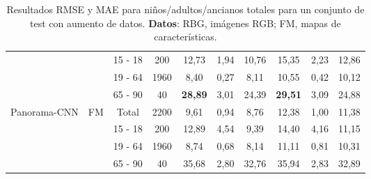 \begin{table}[ht]
{\begin{tabular}{|l|c|c|c|c|c|c|c|c|c|}
 &  & 15 - 18 & 200 & 12,73 & 1,94 & 10,76 & 15,35 & 2,23 & 12,86 \\
 &  & 19 - 64 & 1960 & 8,40 & 0,27 & 8,11 & 10,55 & 0,42 & 10,12 \\
 &  & 65 - 90 & 40 & \textbf{28,89} & 3,01 & 24,39 & \textbf{29,51} & 3,09 & 24,88 \\ 
\hline
\multirow{4}{*}{Panorama-CNN} & \multirow{4}{*}{FM} & Total & 2200 & 9,61 & 0,94 & 8,76 & 12,38 & 1,00 & 11,38 \\
 &  & 15 - 18 & 200 & 12,89 & 4,54 & 9,39 & 14,40 & 4,16 & 11,15 \\
 &  & 19 - 64 & 1960 & 8,74 & 0,68 & 8,14 & 11,11 & 0,81 & 10,31 \\
 &  & 65 - 90 & 40 & 35,68 & 2,80 & 32,76 & 35,94 & 2,83 & 32,89 \\
\hline
\end{tabular}
}
\caption[Resultados RMSE y MAE para niños/adultos/ancianos totales para un conjunto de test con aumento de datos.]{Resultados RMSE y MAE para niños/adultos/ancianos totales para un conjunto de test con aumento de datos. \textbf{Datos}: RBG, imágenes RGB; FM, mapas de características.}
\label{tab:r3_c_total}
\end{table}
